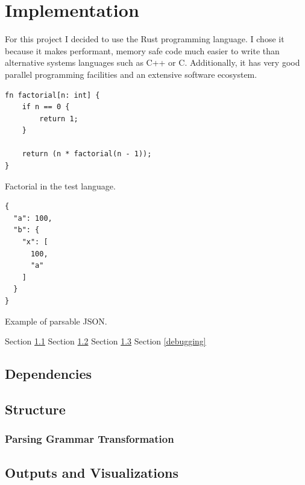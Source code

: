 \chapter{Implementation} \label{implementation}

For this project I decided to use the Rust programming language. I chose
it because it makes performant, memory safe code much easier to write than
alternative systems languages such as C++ or C. Additionally, it has very good
parallel programming facilities and an extensive software ecosystem.

\begin{listing}[H]
\begin{verbatim}
fn factorial[n: int] {
    if n == 0 {
        return 1;
    } 

    return (n * factorial(n - 1));
}
\end{verbatim}
\caption{Factorial in the test language.}
\label{lst:example}
\end{listing}

\begin{listing}[H]
\begin{verbatim}
{
  "a": 100,
  "b": {
    "x": [
      100,
      "a"
    ]
  }
}
\end{verbatim}
\caption{Example of parsable JSON.}
\hrulefill
\label{lst:example}
\end{listing}

Section \ref{dependancies}
\newline \newline
Section \ref{structure}
\newline \newline
Section \ref{outputs_and_visualizations}
\newline \newline
Section \ref{debugging}

\section{Dependencies} \label{dependancies}
\section{Structure} \label{structure}
\subsection{Parsing Grammar Transformation} \label{parsing_grammar_transformation}
\section{Outputs and Visualizations} \label{outputs_and_visualizations}

